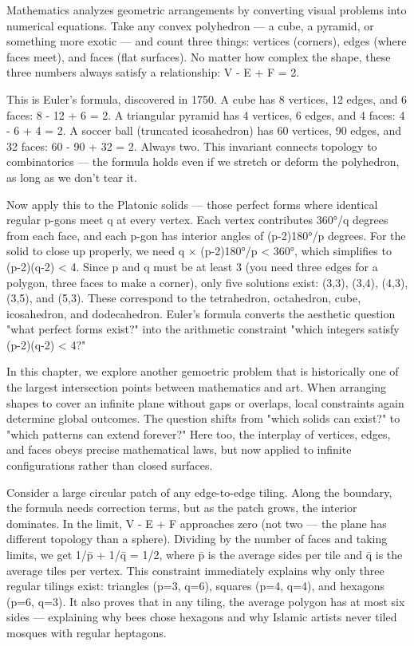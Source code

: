 Mathematics analyzes geometric arrangements by converting visual problems into numerical equations. Take any convex polyhedron — a cube, a pyramid, or something more exotic — and count three things: vertices (corners), edges (where faces meet), and faces (flat surfaces). No matter how complex the shape, these three numbers always satisfy a relationship: V - E + F = 2.

This is Euler's formula, discovered in 1750. A cube has 8 vertices, 12 edges, and 6 faces: 8 - 12 + 6 = 2. A triangular pyramid has 4 vertices, 6 edges, and 4 faces: 4 - 6 + 4 = 2. A soccer ball (truncated icosahedron) has 60 vertices, 90 edges, and 32 faces: 60 - 90 + 32 = 2. Always two. This invariant connects topology to combinatorics — the formula holds even if we stretch or deform the polyhedron, as long as we don't tear it.

Now apply this to the Platonic solids — those perfect forms where identical regular p-gons meet q at every vertex. Each vertex contributes 360°/q degrees from each face, and each p-gon has interior angles of (p-2)180°/p degrees. For the solid to close up properly, we need q × (p-2)180°/p < 360°, which simplifies to (p-2)(q-2) < 4. Since p and q must be at least 3 (you need three edges for a polygon, three faces to make a corner), only five solutions exist: (3,3), (3,4), (4,3), (3,5), and (5,3). These correspond to the tetrahedron, octahedron, cube, icosahedron, and dodecahedron. Euler's formula converts the aesthetic question "what perfect forms exist?" into the arithmetic constraint "which integers satisfy (p-2)(q-2) < 4?"

In this chapter, we explore another gemoetric problem that is historically one of the largest intersection points between mathematics and art. When arranging shapes to cover an infinite plane without gaps or overlaps, local constraints again determine global outcomes. The question shifts from "which solids can exist?" to "which patterns can extend forever?" Here too, the interplay of vertices, edges, and faces obeys precise mathematical laws, but now applied to infinite configurations rather than closed surfaces.

Consider a large circular patch of any edge-to-edge tiling. Along the boundary, the formula needs correction terms, but as the patch grows, the interior dominates. In the limit, V - E + F approaches zero (not two — the plane has different topology than a sphere). Dividing by the number of faces and taking limits, we get 1/p̄ + 1/q̄ = 1/2, where p̄ is the average sides per tile and q̄ is the average tiles per vertex. This constraint immediately explains why only three regular tilings exist: triangles (p=3, q=6), squares (p=4, q=4), and hexagons (p=6, q=3). It also proves that in any tiling, the average polygon has at most six sides — explaining why bees chose hexagons and why Islamic artists never tiled mosques with regular heptagons.

